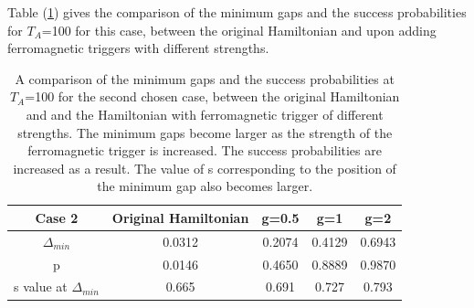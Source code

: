 \documentclass[12]{article}
\begin{document}
Table (\ref{tab:f2}) gives the comparison of the minimum gaps and the success probabilities for $T_A$=100 for this case, between the original Hamiltonian and upon adding ferromagnetic triggers with different strengths.
\begin{table}
\centering
\renewcommand{\arraystretch}{1.8}
\begin{tabular}{|c|c|c|c|c|}
\hline 
Case 2 & Original Hamiltonian & g=0.5 & g=1 & g=2 \\ 
\hline 
$\Delta_{min}$ & 0.0312 & 0.2074 & 0.4129 & 0.6943 \\ 
\hline 
p & 0.0146 & 0.4650 & 0.8889 & 0.9870 \\ 
\hline 
s value at $\Delta_{min}$ & 0.665 & 0.691 & 0.727 & 0.793 \\
\hline

\end{tabular} 
\caption{A comparison of the minimum gaps and the success probabilities at $T_A$=100 for the second chosen case, between the original Hamiltonian and and the Hamiltonian with ferromagnetic trigger of different strengths. The minimum gaps become larger as the strength of the ferromagnetic trigger is increased. The success probabilities are increased as a result. The value of s corresponding to the position of the minimum gap also becomes larger.}
\label{tab:f2}
\end{table}
\end{document}

